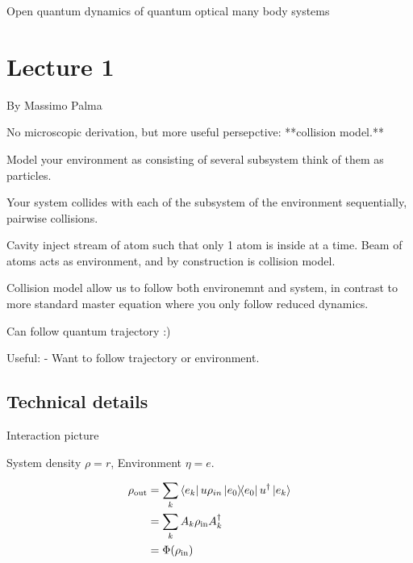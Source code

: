\documentclass[a4paper]{article}
\author{Oscar Emil Sommer}
\begin{document}
Open quantum dynamics of quantum optical many body systems

\section{Lecture 1}
By Massimo Palma

No microscopic derivation, but more useful persepctive: 
**collision model.**

Model your environment as consisting of several subsystem think of them as
particles.

Your system collides with each of the subsystem of the environment sequentially,
pairwise collisions.


\begin{example}[Micromason]
Cavity inject stream of atom such that only 1 atom is inside at a time. Beam of
atoms acts as environment, and by construction is collision model.
\end{example}
Collision model allow us to follow  both environemnt and system, in contrast to
more standard master equation where you only follow reduced dynamics.

Can follow quantum trajectory :)

Useful: 
 - Want to follow trajectory or environment.



 \subsection{Technical details}
Interaction picture

System density $\rho=r$, 
Environment $\eta=e$.
\begin{center}
\end{center}



\begin{align*}
    \rho_\mathrm{out}&=\sum_k \bra{e_k}u\rho_{in}\ket{e_0}\!\!\bra{e_0}u^\dagger\ket{e_k}\\
&=\sum_k A_k \rho_\mathrm{in} A_k^\dagger\\
&=\Phi(\rho_\mathrm{in})
\end{align*}
\end{document}

